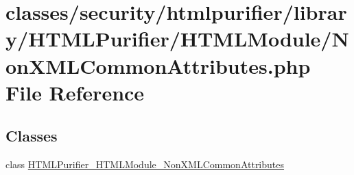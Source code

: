 \hypertarget{NonXMLCommonAttributes_8php}{\section{classes/security/htmlpurifier/library/\+H\+T\+M\+L\+Purifier/\+H\+T\+M\+L\+Module/\+Non\+X\+M\+L\+Common\+Attributes.php File Reference}
\label{NonXMLCommonAttributes_8php}
}
\subsection*{Classes}
\begin{DoxyCompactItemize}
\item 
class \hyperlink{classHTMLPurifier__HTMLModule__NonXMLCommonAttributes}{H\+T\+M\+L\+Purifier\+\_\+\+H\+T\+M\+L\+Module\+\_\+\+Non\+X\+M\+L\+Common\+Attributes}
\end{DoxyCompactItemize}
